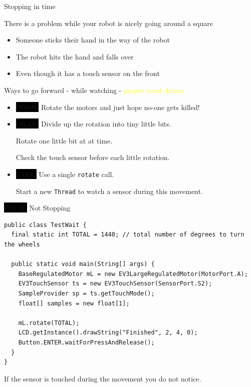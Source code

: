 \documentclass[color=pdftex,usenames,dvipsnames, aspectratio=169]{beamer}
\begin{document}
\begin{frame}{Stopping in time}
\begin{block}{There is a problem while your robot is nicely going around a square}
\begin{itemize}
 \item Someone sticks their hand in the way of the robot
 \item The robot hits the hand and falls over
 \item Even though it has a touch sensor on the front
\end{itemize}
\end{block}

\begin{block}{Ways to go forward - while watching - \textcolor{yellow}{proper event driven}}
\begin{itemize}
\item \colorbox{black}{\color{red}POOR:} Rotate the motors and just hope no-one gets killed!
\item  \colorbox{black}{\color{amber}OKAY:} Divide up the rotation into tiny little bits.

  Rotate one little bit at at time.

  Check the touch sensor before each little rotation.
\item \colorbox{black}{\color{green}SAFE:} Use a single \lstinline!rotate! call. 

Start a new \lstinline!Thread! to  watch a sensor during this movement.
\end{itemize}
\end{block}
\end{frame}

\begin{frame}[fragile]{\colorbox{black}{\color{red}POOR:} Not Stopping}
\begin{lstlisting}[basicstyle=\ttfamily\footnotesize\color{blue}]
public class TestWait {
  final static int TOTAL = 1440; // total number of degrees to turn the wheels

  public static void main(String[] args) {
    BaseRegulatedMotor mL = new EV3LargeRegulatedMotor(MotorPort.A);
    EV3TouchSensor ts = new EV3TouchSensor(SensorPort.S2);
    SampleProvider sp = ts.getTouchMode();
    float[] samples = new float[1];

    mL.rotate(TOTAL);
    LCD.getInstance().drawString("Finished", 2, 4, 0);
    Button.ENTER.waitForPressAndRelease();
  }
}
\end{lstlisting}
\alert{If the sensor is touched during the movement you do not notice.}
\end{frame}
\end{document}
